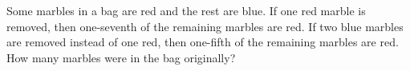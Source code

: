 Some marbles in a bag are red and the rest are blue. If one red marble is removed, then one-seventh of the remaining marbles are red. If two blue marbles are removed instead of one red, then one-fifth of the remaining marbles are red. How many marbles were in the bag originally?
